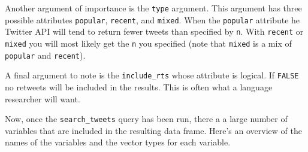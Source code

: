 \documentclass[
]{article}
\begin{document}
Another argument of importance is the \texttt{type} argument. This argument has three possible attributes \texttt{popular}, \texttt{recent}, and \texttt{mixed}. When the \texttt{popular} attribute he Twitter API will tend to return fewer tweets than specified by \texttt{n}. With \texttt{recent} or \texttt{mixed} you will most likely get the \texttt{n} you specified (note that \texttt{mixed} is a mix of \texttt{popular} and \texttt{recent}).

A final argument to note is the \texttt{include\_rts} whose attribute is logical. If \texttt{FALSE} no retweets will be included in the results. This is often what a language researcher will want.

Now, once the \texttt{search\_tweets} query has been run, there a a large number of variables that are included in the resulting data frame. Here's an overview of the names of the variables and the vector types for each variable.
\end{document}
